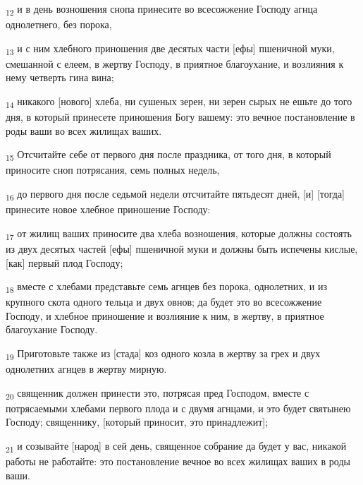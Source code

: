 \begin{tcolorbox}
\textsubscript{12} и в день возношения снопа принесите во всесожжение Господу агнца однолетнего, без порока,
\end{tcolorbox}
\begin{tcolorbox}
\textsubscript{13} и с ним хлебного приношения две десятых части [ефы] пшеничной муки, смешанной с елеем, в жертву Господу, в приятное благоухание, и возлияния к нему четверть гина вина;
\end{tcolorbox}
\begin{tcolorbox}
\textsubscript{14} никакого [нового] хлеба, ни сушеных зерен, ни зерен сырых не ешьте до того дня, в который принесете приношения Богу вашему: это вечное постановление в роды ваши во всех жилищах ваших.
\end{tcolorbox}
\begin{tcolorbox}
\textsubscript{15} Отсчитайте себе от первого дня после праздника, от того дня, в который приносите сноп потрясания, семь полных недель,
\end{tcolorbox}
\begin{tcolorbox}
\textsubscript{16} до первого дня после седьмой недели отсчитайте пятьдесят дней, [и] [тогда] принесите новое хлебное приношение Господу:
\end{tcolorbox}
\begin{tcolorbox}
\textsubscript{17} от жилищ ваших приносите два хлеба возношения, которые должны состоять из двух десятых частей [ефы] пшеничной муки и должны быть испечены кислые, [как] первый плод Господу;
\end{tcolorbox}
\begin{tcolorbox}
\textsubscript{18} вместе с хлебами представьте семь агнцев без порока, однолетних, и из крупного скота одного тельца и двух овнов; да будет это во всесожжение Господу, и хлебное приношение и возлияние к ним, в жертву, в приятное благоухание Господу.
\end{tcolorbox}
\begin{tcolorbox}
\textsubscript{19} Приготовьте также из [стада] коз одного козла в жертву за грех и двух однолетних агнцев в жертву мирную.
\end{tcolorbox}
\begin{tcolorbox}
\textsubscript{20} священник должен принести это, потрясая пред Господом, вместе с потрясаемыми хлебами первого плода и с двумя агнцами, и это будет святынею Господу; священнику, [который приносит, это принадлежит];
\end{tcolorbox}
\begin{tcolorbox}
\textsubscript{21} и созывайте [народ] в сей день, священное собрание да будет у вас, никакой работы не работайте: это постановление вечное во всех жилищах ваших в роды ваши.
\end{tcolorbox}
